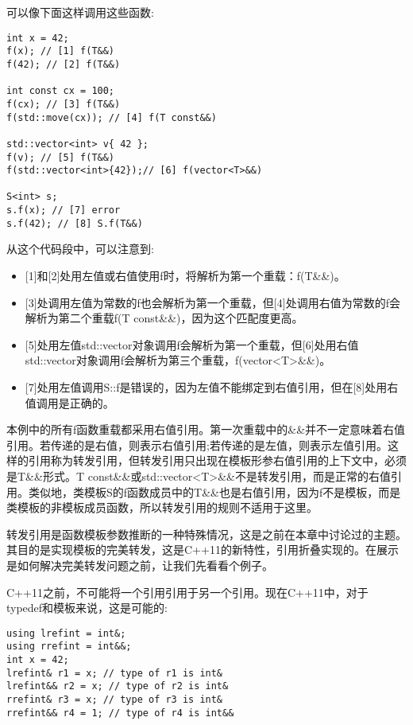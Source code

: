 可以像下面这样调用这些函数:

\begin{lstlisting}[style=styleCXX]
int x = 42;
f(x); // [1] f(T&&)
f(42); // [2] f(T&&)

int const cx = 100;
f(cx); // [3] f(T&&)
f(std::move(cx)); // [4] f(T const&&)

std::vector<int> v{ 42 };
f(v); // [5] f(T&&)
f(std::vector<int>{42});// [6] f(vector<T>&&)

S<int> s;
s.f(x); // [7] error
s.f(42); // [8] S.f(T&&)
\end{lstlisting}

从这个代码段中，可以注意到:

\begin{itemize}
\item
{}[1]和[2]处用左值或右值使用f时，将解析为第一个重载：f(T\&\&)。

\item
{}[3]处调用左值为常数的f也会解析为第一个重载，但[4]处调用右值为常数的f会解析为第二个重载f(T const\&\&)，因为这个匹配度更高。

\item
{}[5]处用左值std::vector对象调用f会解析为第一个重载，但[6]处用右值std::vector对象调用f会解析为第三个重载，f(vector<T>\&\&)。

\item
{}[7]处用左值调用S::f是错误的，因为左值不能绑定到右值引用，但在[8]处用右值调用是正确的。
\end{itemize}

本例中的所有f函数重载都采用右值引用。第一次重载中的\&\&并不一定意味着右值引用。若传递的是右值，则表示右值引用;若传递的是左值，则表示左值引用。这样的引用称为转发引用，但转发引用只出现在模板形参右值引用的上下文中，必须是T\&\&形式。T const\&\&或std::vector<T>\&\&不是转发引用，而是正常的右值引用。类似地，类模板S的f函数成员中的T\&\&也是右值引用，因为f不是模板，而是类模板的非模板成员函数，所以转发引用的规则不适用于这里。

转发引用是函数模板参数推断的一种特殊情况，这是之前在本章中讨论过的主题。其目的是实现模板的完美转发，这是C++11的新特性，引用折叠实现的。在展示是如何解决完美转发问题之前，让我们先看看个例子。

C++11之前，不可能将一个引用引用于另一个引用。现在C++11中，对于 typedef和模板来说，这是可能的:

\begin{lstlisting}[style=styleCXX]
using lrefint = int&;
using rrefint = int&&;
int x = 42;
lrefint& r1 = x; // type of r1 is int&
lrefint&& r2 = x; // type of r2 is int&
rrefint& r3 = x; // type of r3 is int&
rrefint&& r4 = 1; // type of r4 is int&&
\end{lstlisting}

